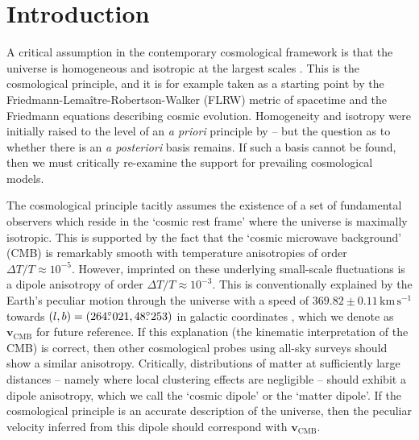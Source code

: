 \documentclass[fleqn,usenatbib]{mnras}
\newcommand{\dotdeg}{\rlap{.}^\circ}
\begin{document}
\section{Introduction}%
    A critical assumption in the contemporary cosmological framework is that the universe is homogeneous and isotropic at the largest scales \citep{harrison2000}.
    This is the cosmological principle, and it is for example taken as a starting point by the Friedmann-Lema\^{i}tre-Robertson-Walker (FLRW) metric of spacetime and the Friedmann equations describing cosmic evolution.
    Homogeneity and isotropy were initially raised to the level of an \textit{a priori} principle by \citet{milne1935} -- but the question as to whether there is an \textit{a posteriori} basis remains.
    If such a basis cannot be found, then we must critically re-examine the support for prevailing cosmological models.
    
    The cosmological principle tacitly assumes the existence of a set of fundamental observers which reside in the `cosmic rest frame' where the universe is maximally isotropic.
    This is supported by the fact that the `cosmic microwave background' (CMB) is remarkably smooth with temperature anisotropies of order $\Delta T / T \approx 10^{-5}$. 
    However, imprinted on these underlying small-scale fluctuations is a dipole anisotropy of order $\Delta T / T \approx 10^{-3}$. 
    This is conventionally explained by the Earth's peculiar motion through the universe with a speed of $369.82\pm0.11\,\text{km}\,\text{s}^{-1}$ towards $(l,b) = (264\dotdeg021, 48\dotdeg253)$ in galactic coordinates \citep{planck2020}, which we denote as $\mathbf{v}_\text{CMB}$ for future reference.
    If this explanation (the kinematic interpretation of the CMB) is correct, then other cosmological probes using all-sky surveys should show a similar anisotropy.
    Critically, distributions of matter at sufficiently large distances -- namely where local clustering effects are negligible -- should exhibit a dipole anisotropy, which we call the `cosmic dipole' or the `matter dipole'.
    If the cosmological principle is an accurate description of the universe, then the peculiar velocity inferred from this dipole should correspond with $\mathbf{v}_\text{CMB}$.
    
\end{document}

